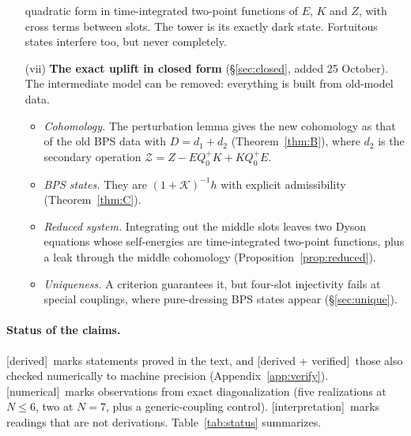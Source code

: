 \documentclass[11pt]{article}
\newcommand{\Zc}{\mathcal Z}
\newcommand{\Kc}{\mathcal K}
\newcommand{\tagbox}[2]{\textsf{\small\color{#1}[#2]}}
\newcommand{\DER}{\tagbox{cder}{derived}}
\newcommand{\VER}{\tagbox{cder}{derived + verified}}
\newcommand{\NUM}{\tagbox{cnum}{numerical}}
\newcommand{\INTERP}{\tagbox{cconj}{interpretation}}
\theoremstyle{plain}
\theoremstyle{remark}
\numberwithin{equation}{section}
\begin{document}
\begin{enumerate}
  quadratic form in time-integrated two-point functions of $E$, $K$ and $Z$, with cross terms between slots. The tower is
  its exactly dark state. Fortuitous states interfere too, but never completely.
\item[(vii)] \textbf{The exact uplift in closed form} (\S\ref{sec:closed}, added 25 October). The intermediate model
  can be removed: everything is built from old-model data.
  \begin{itemize}\itemsep1pt
  \item \emph{Cohomology.} The perturbation lemma gives the new cohomology as that of the old BPS data with
    $D=d_1+d_2$ (Theorem~\ref{thm:B}), where $d_2$ is the secondary operation $\Zc=Z-EQ_0^+K+KQ_0^+E$.
  \item \emph{BPS states.} They are $(1+\Kc)^{-1}h$ with explicit admissibility (Theorem~\ref{thm:C}).
  \item \emph{Reduced system.} Integrating out the middle slots leaves two Dyson equations whose self-energies are
    time-integrated two-point functions, plus a leak through the middle cohomology (Proposition~\ref{prop:reduced}).
  \item \emph{Uniqueness.} A criterion guarantees it, but four-slot injectivity fails at special couplings, where
    pure-dressing BPS states appear (\S\ref{sec:unique}).
  \end{itemize}
\end{enumerate}

\paragraph{Status of the claims.} \DER\ marks statements proved in the text, and \VER\ those also checked numerically to
machine precision (Appendix~\ref{app:verify}). \NUM\ marks observations from exact diagonalization (five realizations at
$N\le6$, two at $N=7$, plus a generic-coupling control). \INTERP\ marks readings that are not derivations.
Table~\ref{tab:status} summarizes.
\end{document}
